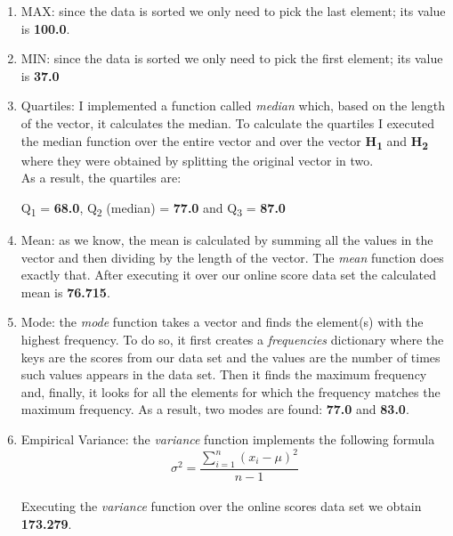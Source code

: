 \documentclass[11pt]{article}
\begin{document}
\begin{enumerate}[label=(\alph*)]
\item MAX: since the data is sorted we only need to pick the last element; its value is \textbf{100.0}.

\item MIN: since the data is sorted we only need to pick the first element; its value is \textbf{37.0}

\item Quartiles: I implemented a function called \textit{median} which, based on the length of the vector, it calculates the median. To calculate the quartiles I executed the median function over the entire vector and over the vector \textbf{H\textsubscript{1}} and \textbf{ H\textsubscript{2}} where they were obtained by splitting the original vector in two.\\
As a result, the quartiles are:\\
\begin{nscenter}
 Q\textsubscript{1} = \textbf{68.0}, 
 Q\textsubscript{2} (median) = \textbf{77.0} and
 Q\textsubscript{3} = \textbf{87.0}
\end{nscenter}

\item Mean: as we know, the mean is calculated by summing all the values in the vector and then dividing by the length of the vector. The \textit{mean} function does exactly that. After executing it over our online score data set the calculated mean is \textbf{76.715}.

\item Mode: the \textit{mode} function takes a vector and finds the element(s) with the highest frequency. To do so, it first creates a \textit{frequencies} dictionary where the keys are the scores from our data set and the values are the number of times such values appears in the data set. Then it finds the maximum frequency and, finally, it looks for all the elements for which the frequency matches the maximum frequency. As a result, two modes are found: \textbf{77.0} and \textbf{83.0}.

\item Empirical Variance: the \textit{variance} function implements the following formula
\[ \sigma^2 = \frac{\displaystyle \sum ^n_{i=1}(x_i - \mu)^2} {n - 1} \]\\
Executing the \textit{variance} function over the online scores data set we obtain \textbf{173.279}.

\end{enumerate}
\end{document}
